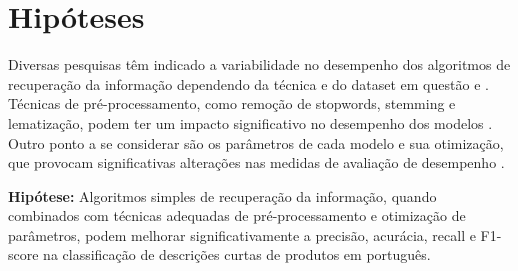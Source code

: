 \section{Hipóteses}

Diversas pesquisas têm indicado a variabilidade no desempenho dos algoritmos de recuperação da informação dependendo da técnica e do dataset em questão \cite{alsmadi2019review} e \cite{aggarwal2018review}. Técnicas de pré-processamento, como remoção de stopwords, stemming e lematização, podem ter um impacto significativo no desempenho dos modelos \cite{naseem2021survey}. Outro ponto a se considerar são os parâmetros de cada modelo e sua otimização, que provocam significativas alterações nas medidas de avaliação de desempenho \cite{bhavani2021review}.

\textbf{Hipótese:} Algoritmos simples de recuperação da informação, quando combinados com técnicas adequadas de pré-processamento e otimização de parâmetros, podem melhorar significativamente a precisão, acurácia, recall e F1-score na classificação de descrições curtas de produtos em português.








